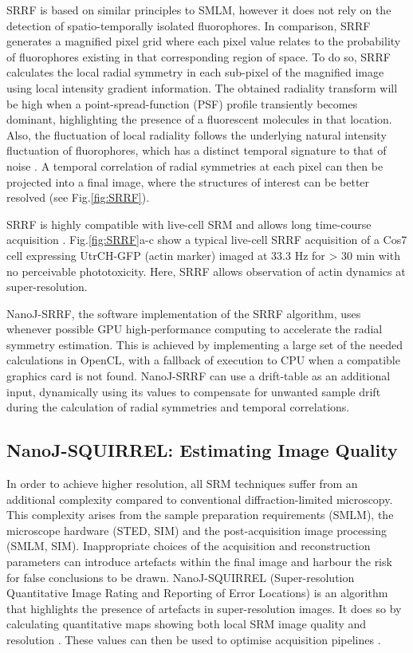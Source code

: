  SRRF is based on similar principles to SMLM, however it does not rely on the detection of spatio-temporally isolated fluorophores. In comparison, SRRF generates a magnified pixel grid where each pixel value relates to the probability of fluorophores existing in that corresponding region of space. To do so, SRRF calculates the local radial symmetry in each sub-pixel of the magnified image using local intensity gradient information. The obtained radiality transform will be high when a point-spread-function (PSF) profile transiently becomes dominant, highlighting the presence of a fluorescent molecules in that location. Also, the fluctuation of local radiality follows the underlying natural intensity fluctuation of fluorophores, which has a distinct temporal signature to that of noise \cite{dertinger2009fast}. A temporal correlation of radial symmetries at each pixel can then be projected into a final image, where the structures of interest can be better resolved (see Fig.\ref{fig:SRRF}).

 SRRF is highly compatible with live-cell SRM and allows long time-course acquisition \cite{culley2018srrf}. Fig.\ref{fig:SRRF}a-c show a typical live-cell SRRF acquisition of a Cos7 cell expressing UtrCH-GFP (actin marker) imaged at 33.3 Hz for > 30 min with no perceivable phototoxicity. Here, SRRF allows observation of actin dynamics at super-resolution.
 
 NanoJ-SRRF, the software implementation of the SRRF algorithm, uses whenever possible GPU high-performance computing to accelerate the radial symmetry estimation. This is achieved by implementing a large set of the needed calculations in OpenCL, with a fallback of execution to CPU when a compatible graphics card is not found. NanoJ-SRRF can use a drift-table as an additional input, dynamically using its values to compensate for unwanted sample drift during the calculation of radial symmetries and temporal correlations.

\subsection*{NanoJ-SQUIRREL: Estimating Image Quality}
 In order to achieve higher resolution, all SRM techniques suffer from an additional complexity compared to conventional diffraction-limited microscopy. This complexity arises from the sample preparation requirements (SMLM), the microscope hardware (STED, SIM) and the post-acquisition image processing (SMLM, SIM). Inappropriate choices of the acquisition and reconstruction parameters can introduce artefacts within the final image and harbour the risk for false conclusions to be drawn. NanoJ-SQUIRREL (Super-resolution Quantitative Image Rating and Reporting of Error Locations) is an algorithm that highlights the presence of artefacts in super-resolution images. It does so by calculating quantitative maps showing both local SRM image quality and resolution \cite{culley2018quantitative}. These values can then be used to optimise acquisition pipelines \cite{culley2018srrf}.

